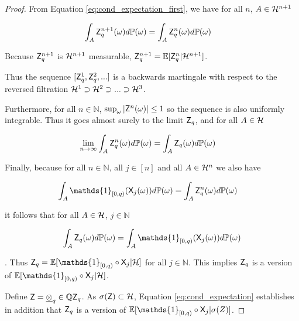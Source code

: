 \begin{proof}
From Equation \ref{eq:cond_expectation_first}, we have for all $n$, $A\in \mathcal{H}^{n+1}$

\begin{align}
    \int_{A} \mathsf{Z}_q^{n+1} (\omega) d\mathbb{P}(\omega) &= \int_{A} \mathsf{Z}_q^{n} (\omega) d\mathbb{P}(\omega)
\end{align}

Because $\mathsf{Z}_q^{n+1}$ is $\mathcal{H}^{n+1}$ measurable, $\mathsf{Z}_q^{n+1} = \mathbb{E}[\mathsf{Z}_q^{n}|\mathcal{H}^{n+1}]$.

Thus the sequence $[\mathsf{Z}^1_q,\mathsf{Z}^2_q,...]$ is a backwards martingale with respect to the reversed filtration $\mathcal{H}^1\supset\mathcal{H}^2\supset...\supset \mathcal{H}^3$.

Furthermore, for all $n\in \mathbb{N}$, $\sup_\omega|\mathsf{Z}^n(\omega)|\leq 1$ so the sequence is also uniformly integrable. Thus it goes almost surely to the limit $\mathsf{Z}_q$, and for all $A\in \mathcal{H}$

\begin{align}
    \lim_{n\to\infty} \int_A \mathsf{Z}^n_q(\omega) d\mathbb{P}(\omega) &= \int_A \mathsf{Z}_q(\omega) d\mathbb{P}(\omega)
\end{align}

Finally, because for all $n\in \mathbb{N}$, all $j\in[n]$ and all $A\in \mathcal{H}^n$ we also have

\begin{align}
    \int_A \mathds{1}_{[0,q)}(\RV{X}_j(\omega))d\prob{P}(\omega) &= \int_A \RV{Z}_q^n(\omega) d\prob{P}(\omega)
\end{align}

it follows that for all $A\in \mathcal{H}$, $j\in \mathbb{N}$

\begin{align}
    \int_A \RV{Z}_q(\omega) d\prob{P}(\omega) = \int_A \mathds{1}_{[0,q)}(\RV{X}_j(\omega))d\prob{P}(\omega)\label{eq:cond_expectation}
\end{align}

\citep[Thm ~4.7]{cinlar_probability_2011}. Thus $\RV{Z}_q = \mathbb{E}[\mathds{1}_{[0,q)}\circ\RV{X}_j|\sigalg{H}]$ for all $j\in \mathbb{N}$. This implies $\mathsf{Z}_q$ is a version of $\mathbb{E}[\mathds{1}_{[0,q)}\circ \RV{X}_j|\sigalg{H}]$.

Define $\mathsf{Z} = \underline{\otimes}_q\in \mathbb{Q} \mathsf{Z}_q$. As $\sigma(\mathsf{Z})\subset\mathcal{H}$, Equation \ref{eq:cond_expectation} establishes in addition that $\mathsf{Z}_q$ is a version of $\mathbb{E}[\mathds{1}_{[0,q)}\circ \RV{X}_j|\sigma(Z)]$. 


\end{proof}
